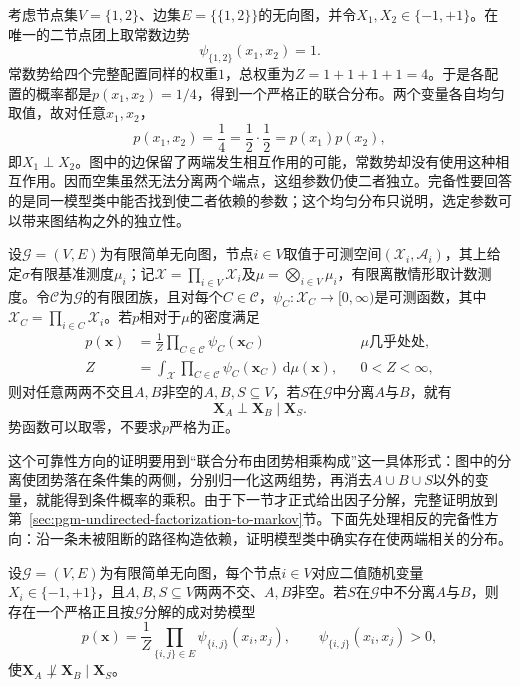 \begin{example}[不分离不强迫固定分布相关]
  \label{ex:pgm-undirected-fixed-distribution-extra-independence}
  考虑节点集$V=\{1,2\}$、边集$E=\{\{1,2\}\}$的无向图，并令$X_1,X_2\in\{-1,+1\}$。在唯一的二节点团上取常数边势
  \[
    \psi_{\{1,2\}}(x_1,x_2)=1.
  \]
  常数势给四个完整配置同样的权重$1$，总权重为$Z=1+1+1+1=4$。于是各配置的概率都是$p(x_1,x_2)=1/4$，得到一个严格正的联合分布。两个变量各自均匀取值，故对任意$x_1,x_2$，
  \[
    p(x_1,x_2)=\frac14
    =\frac12\cdot\frac12
    =p(x_1)p(x_2),
  \]
  即$X_1\perp X_2$。图中的边保留了两端发生相互作用的可能，常数势却没有使用这种相互作用。因而空集虽然无法分离两个端点，这组参数仍使二者独立。完备性要回答的是同一模型类中能否找到使二者依赖的参数；这个均匀分布只说明，选定参数可以带来图结构之外的独立性。
\end{example}

\begin{theorem}[团因子分解分布上的分离可靠性]
  \label{thm:pgm-undirected-factorization-to-global}
  设$\mathcal{G}=(V,E)$为有限简单无向图，节点$i\in V$取值于可测空间$(\mathcal{X}_i,\mathcal{A}_i)$，其上给定$\sigma$有限基准测度$\mu_i$；记$\mathcal{X}=\prod_{i\in V}\mathcal{X}_i$及$\mu=\bigotimes_{i\in V}\mu_i$，有限离散情形取计数测度。令$\mathcal{C}$为$\mathcal{G}$的有限团族，且对每个$C\in\mathcal{C}$，$\psi_C:\mathcal{X}_C\to[0,\infty)$是可测函数，其中$\mathcal{X}_C=\prod_{i\in C}\mathcal{X}_i$。若$p$相对于$\mu$的密度满足
  \[
    \begin{aligned}
      p(\bm{x})
      &=\frac{1}{Z}\prod_{C\in\mathcal{C}}\psi_C(\bm{x}_C)
        &&\text{$\mu$几乎处处},\\
      Z
      &=\int_{\mathcal{X}}\prod_{C\in\mathcal{C}}
        \psi_C(\bm{x}_C)\,\mathrm{d}\mu(\bm{x}),
        &&0<Z<\infty,
    \end{aligned}
  \]
  则对任意两两不交且$A,B$非空的$A,B,S\subseteq V$，若$S$在$\mathcal{G}$中分离$A$与$B$，就有
  \[
    \bm{X}_A\perp\bm{X}_B\mid\bm{X}_S.
  \]
  势函数可以取零，不要求$p$严格为正。
\end{theorem}

这个可靠性方向的证明要用到“联合分布由团势相乘构成”这一具体形式：图中的分离使团势落在条件集的两侧，分别归一化这两组势，再消去$A\cup B\cup S$以外的变量，就能得到条件概率的乘积。由于下一节才正式给出因子分解，完整证明放到第~\ref{sec:pgm-undirected-factorization-to-markov}节。下面先处理相反的完备性方向：沿一条未被阻断的路径构造依赖，证明模型类中确实存在使两端相关的分布。

\begin{theorem}[严格正二值成对势模型类中的分离完备性]
  \label{thm:pgm-undirected-separation-completeness}
  设$\mathcal{G}=(V,E)$为有限简单无向图，每个节点$i\in V$对应二值随机变量$X_i\in\{-1,+1\}$，且$A,B,S\subseteq V$两两不交、$A,B$非空。若$S$在$\mathcal{G}$中不分离$A$与$B$，则存在一个严格正且按$\mathcal{G}$分解的成对势模型
  \[
    p(\bm{x})=\frac{1}{Z}
      \prod_{\{i,j\}\in E}\psi_{\{i,j\}}(x_i,x_j),
    \qquad \psi_{\{i,j\}}(x_i,x_j)>0,
  \]
  使$\bm{X}_A\not\perp\bm{X}_B\mid\bm{X}_S$。
\end{theorem}

